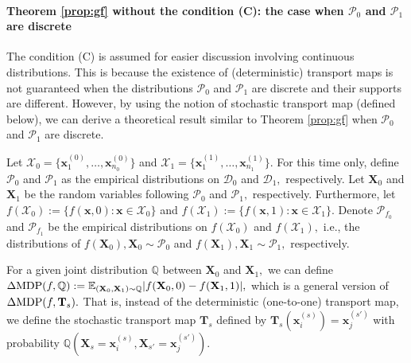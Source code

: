 \documentclass[10pt]{article} %
\newtheorem{remark}[theorem]{Remark}
\begin{document}
    \paragraph{Theorem \ref{prop:gf} without the condition (C): the case when $\mathcal{P}_{0}$ and $\mathcal{P}_{1}$ are discrete}
        The condition (C) is assumed for easier discussion involving continuous distributions.
        This is because the existence of (deterministic) transport maps is not guaranteed when the distributions $\mathcal{P}_{0}$ and $\mathcal{P}_{1}$ are discrete and their supports are different.
        However, by using the notion of stochastic transport map (defined below), we can derive a theoretical result similar to Theorem \ref{prop:gf} when $\mathcal{P}_{0}$ and $\mathcal{P}_{1}$ are discrete.

        Let $\mathcal{X}_{0} = \{ \mathbf{x}_{1}^{(0)}, \ldots, \mathbf{x}_{n_{0}}^{(0)} \}$ and $\mathcal{X}_{1} = \{ \mathbf{x}_{1}^{(1)}, \ldots, \mathbf{x}_{n_{1}}^{(1)} \}.$
        For this time only, define $\mathcal{P}_{0}$ and $\mathcal{P}_{1}$ as the empirical distributions on $\mathcal{D}_{0}$ and $\mathcal{D}_{1},$ respectively.
        Let $\mathbf{X}_{0}$ and $\mathbf{X}_{1}$ be the random variables following $\mathcal{P}_{0}$ and $\mathcal{P}_{1},$ respectively.
        Furthermore, let $f(\mathcal{X}_{0}) := \{ f(\mathbf{x}, 0) : \mathbf{x} \in \mathcal{X}_{0} \}$ and $f(\mathcal{X}_{1}) := \{ f(\mathbf{x}, 1) : \mathbf{x} \in \mathcal{X}_{1} \}.$
        Denote $\mathcal{P}_{f_{0}}$ and $\mathcal{P}_{f_{1}}$ be the empirical distributions on $f(\mathcal{X}_{0})$ and $f(\mathcal{X}_{1}),$
        i.e., the distributions of $f(\mathbf{X}_{0}), \mathbf{X}_{0} \sim \mathcal{P}_{0}$ and $f(\mathbf{X}_{1}), \mathbf{X}_{1} \sim \mathcal{P}_{1},$ respectively.

        For a given joint distribution $\mathbb{Q}$ between $\mathbf{X}_{0}$ and $\mathbf{X}_{1},$
        we can define $\Delta \textup{MDP} (f, \mathbb{Q}) := \mathbb{E}_{(\mathbf{X}_{0}, \mathbf{X}_{1}) \sim \mathbb{Q}} \vert f(\mathbf{X}_{0}, 0) - f(\mathbf{X}_{1}, 1) \vert,$
        which is a general version of $\Delta \textup{MDP}(f, \mathbf{T}_{s}).$
        That is, instead of the deterministic (one-to-one) transport map, we define the stochastic transport map $\mathbf{T}_{s}$ defined by $\mathbf{T}_{s}(\mathbf{x}_{i}^{(s)}) = \mathbf{x}_{j}^{(s')}$ with probability $\mathbb{Q}(\mathbf{X}_{s} = \mathbf{x}_{i}^{(s)}, \mathbf{X}_{s'} = \mathbf{x}_{j}^{(s')}).$
\end{document}
